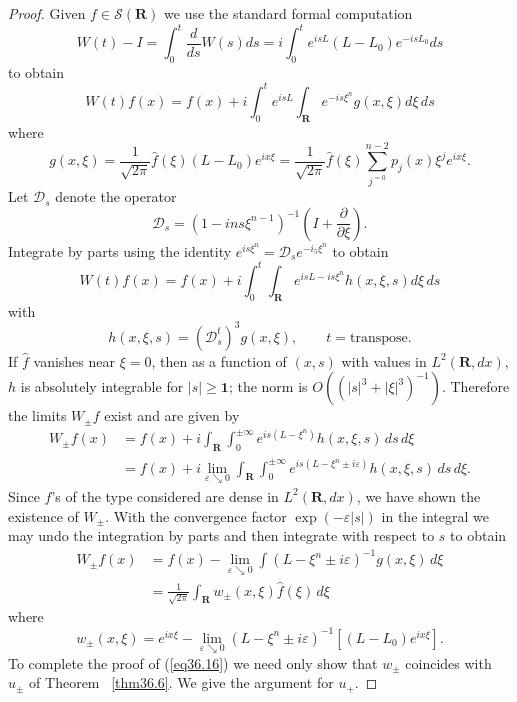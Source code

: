 \documentclass{surv-l}
\theoremstyle{plain}
\theoremstyle{definition}
\numberwithin{equation}{chapter}
\begin{document}
\begin{proof}
Given $f\in \mathscr{S}(\mathbf{R})$ we use the standard formal computation
\begin{equation*}
W(t)-I=\int_{0}^{t}\frac{d}{ds}W(s)ds=i\int_{0}^{t}e^{isL}(L-L_{0})e^{-isL_{0}}ds
\end{equation*}
to obtain
\begin{equation*}
W(t)f(x)=f(x)+i\int_{0}^{t}e^{isL}\int_{\mathbf{R}}e^{-is\xi^{{n}}}g(x, \xi)d\xi\, ds
\end{equation*}
where
\begin{equation*}
g(x,\xi)=\frac{1}{\sqrt{2\pi}}\hat{f}(\xi)(L-L_{0})e^{ix\xi}=\frac{1}{\sqrt{2\pi}}\hat{f}(\xi)\sum_{j^{=0}}^{n-2}p_{j}(x)\xi^{j}e^{ix\xi}.
\end{equation*}
Let $\mathscr{D}_{s}$ denote the operator
\begin{equation*}
\mathscr{D}_{s}=(1-ins\xi^{n-1})^{-1}\left(I+\frac{\partial}{\partial\xi}\right).
\end{equation*}
Integrate by parts using the identity $e^{is\xi^{n}}=\mathscr{D}_{s}e^{-i_{5}\xi^{n}}$ to obtain
\begin{equation*}
W(t)f(x)=f(x)+i\int_{0}^{t}\int_{\mathbf{R}}e^{isL-is\xi^{n}}h(x, \xi, s)d\xi\, ds
\end{equation*}
with
\begin{equation*}
h(x, \xi, s)=(\mathscr{D}_{s}^{t})^{3}g(x, \xi),\qquad t= \mathrm{transpose}.
\end{equation*}
If $\hat{f}$ vanishes near $\xi=0$, then as a function of $(x, s)$ with values in $L^{2} (\mathbf{R}, dx)$, $h$ is absolutely integrable for $|s|\geq \mathbf{1}$; the norm is $O((|s|^{3}+|\xi|^{3})^{-1})$. Therefore the limits $W_{\pm}f$ exist and are given by
\begin{align*}
W_{\pm}f(x)&=f(x)+i\int_{\mathbf{R}}\int_{0}^{\pm\infty}e^{is(L-\xi^{n})}h(x, \xi, s)\, ds\,  d\xi\\
&=f(x)+i\lim_{\varepsilon\searrow 0}\int_{\mathbf{R}}\int_{0}^{\pm\infty}e^{is(L-\xi^{n}\pm i\varepsilon)}h(x, \xi, s)\,ds\, d\xi.
\end{align*}
Since $f$'s of the type considered are dense in $L^{2}(\mathbf{R}, dx)$, we have shown the existence of $ W_{\pm}$. With the convergence factor $\exp(-\varepsilon|s|)$ in the integral we may undo the integration by parts and then integrate with respect to $s$ to obtain
\begin{align*}
W_{\pm}f(x)&=f(x)-\lim_{\varepsilon\searrow 0}\int(L-\xi^{n}\pm i\varepsilon)^{-1}g(x, \xi)\,d\xi\\
&=\frac{1}{\sqrt{2\pi}}\int_{\mathbf{R}}w_{\pm}(x, \xi)\hat{f}(\xi)\,d\xi
\end{align*}
where
\begin{equation}\label{eq36.19}
w_{\pm}(x,\xi)=e^{ix\xi}-\lim_{\varepsilon\searrow 0}(L-\xi^{n}\pm i\varepsilon)^{-1}[(L-L_{0})e^{ix\xi}].
\end{equation}
To complete the proof of (\ref{eq36.16}) we need only show that $w_{\pm}$ coincides with $u_{\pm}$ of Theorem ~\ref{thm36.6}. We give the argument for $u_{+}$.



\end{proof}
\end{document}
